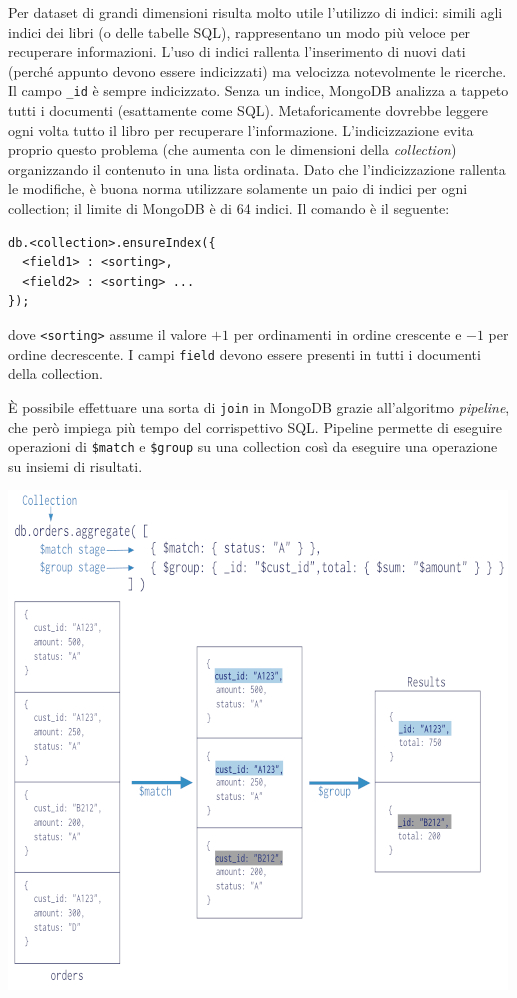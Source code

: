 \documentclass[a4page, 11pt]{article}
\begin{document}
Per dataset di grandi dimensioni risulta molto utile l'utilizzo di indici: simili agli indici dei libri (o delle tabelle SQL), rappresentano un modo più veloce per recuperare informazioni.
L'uso di indici rallenta l'inserimento di nuovi dati (perché appunto devono essere indicizzati) ma velocizza notevolmente le ricerche.
Il campo \verb|_id| è sempre indicizzato.
Senza un indice, MongoDB analizza a tappeto tutti i documenti (esattamente come SQL).
Metaforicamente dovrebbe leggere ogni volta tutto il libro per recuperare l'informazione.
L'indicizzazione evita proprio questo problema (che aumenta con le dimensioni della \textit{collection}) organizzando il contenuto in una lista ordinata.
Dato che l'indicizzazione rallenta le modifiche, è buona norma utilizzare solamente un paio di indici per ogni collection; il limite di MongoDB è di 64 indici.
Il comando è il seguente:
\begin{verbatim}
db.<collection>.ensureIndex({
  <field1> : <sorting>,
  <field2> : <sorting> ...
});
\end{verbatim}
dove \verb|<sorting>| assume il valore $+1$ per ordinamenti in ordine crescente e $-1$ per ordine decrescente.
I campi \verb|field| devono essere presenti in tutti i documenti della collection.

È possibile effettuare una sorta di \verb|join| in MongoDB grazie all'algoritmo \textit{pipeline}\cite{NoSQLDB}, che però impiega più tempo del corrispettivo SQL.
Pipeline permette di eseguire operazioni di \verb|$match| e \verb|$group| su una collection così da eseguire una operazione su insiemi di risultati.
\begin{center}
  \includegraphics[scale=0.6]{mongodb-pipeline.jpg}
\end{center}
\end{document}
